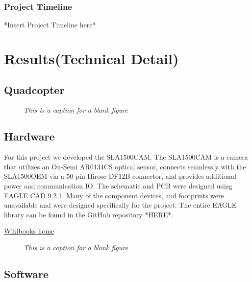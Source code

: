 \documentclass[11pt]{article}
\begin{document}
\subsubsection{Project Timeline}

*Insert Project Timeline here*







\section{Results(Technical Detail)}
\subsection{Quadcopter}

\blindtext

    \begin{figure}[H]
	\centering	
	\caption{\textit{This is a caption for a blank figure}}	
	\end{figure}

\subsection{Hardware}

For this project we developed the SLA1500CAM. The SLA1500CAM is a camera that utilizes an On-Semi AR0134CS optical sensor, connects seamlessly with the SLA1500OEM via a 50-pin Hirose DF12B connector, and provides additional power and communication IO. The schematic and PCB were designed using EAGLE CAD 9.2.1. Many of the component devices, and footprints were unavailable and were designed specifically for the project. The entire EAGLE library can be found in the GitHub repository *HERE*. 

\href{https://www.wikibooks.org}{Wikibooks home}

    \begin{figure}[H]
	\centering	
	\caption{\textit{This is a caption for a blank figure}}	
	\end{figure}

\subsection{Software}
\end{document}
